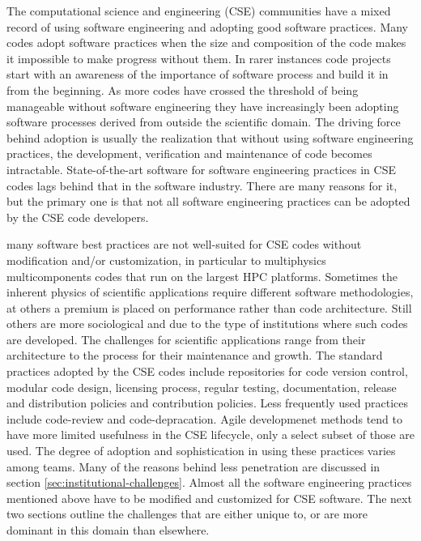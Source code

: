 The computational science and engineering (CSE) communities have a mixed record
of using software engineering and adopting good software
practices. Many codes adopt software practices when the size
and composition of the code makes it impossible to make progress
without them. In rarer instances code projects start with an awareness
of the importance of software process and build it in from the
beginning. As more codes have crossed the threshold of being
manageable without software engineering they have increasingly been  
adopting software processes derived from outside the scientific
domain. The driving force behind adoption is usually the realization
that without using software engineering practices, the development,
verification and maintenance of code becomes
intractable. State-of-the-art software for software engineering
practices in CSE codes lags behind that in the software
industry. There are many reasons for it, but the primary one is that
not all software engineering practices can be adopted by the CSE code
developers. 

many software best practices are not well-suited for CSE codes without
modification and/or customization, in particular to multiphysics
multicomponents codes that run on the largest HPC platforms. Sometimes
the inherent physics of scientific applications require different
software methodologies, at others a premium is placed on
performance rather than code architecture.  Still others are more
sociological and due to the type of institutions where such codes are
developed. The challenges for scientific applications range
from their architecture to the process for their maintenance and
growth. The standard practices adopted by the CSE codes include
repositories for code version control, modular code design, licensing
process, regular testing, documentation, release and distribution
policies and contribution policies. Less frequently used practices
include code-review and code-depracation. Agile developmenet methods
tend to have more limited usefulness in the CSE lifecycle, only a
select subset of those are used. The degree of adoption and
sophistication in using these  practices varies among teams. Many of
the reasons behind less penetration are discussed in section
\ref{sec:institutional-challenges}. Almost all the software
engineering practices mentioned above have to be modified and
customized for CSE software. The next two sections outline the
challenges that are either unique to, or are more dominant in this
domain than elsewhere. 


